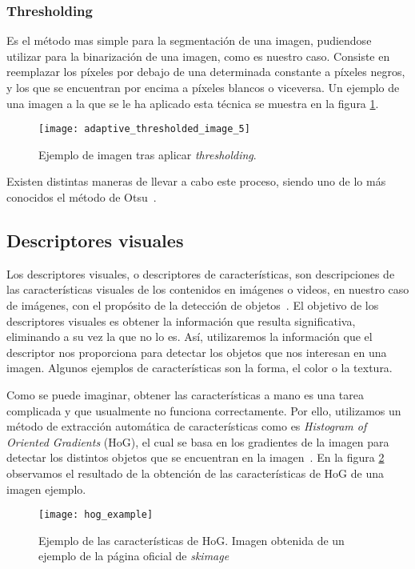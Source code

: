 \subsubsection{Thresholding}

Es el método mas simple para la segmentación de una imagen, pudiendose utilizar para la binarización de una imagen, como es nuestro caso. Consiste en reemplazar los píxeles por debajo de una determinada constante a píxeles negros, y los que se encuentran por encima a píxeles blancos o viceversa. Un ejemplo de una imagen a la que se le ha aplicado esta técnica se muestra en la figura \ref{fig:3.2.1}.

\begin{figure}
\centering
\texttt{[image: adaptive\_thresholded\_image\_5]}
\caption{Ejemplo de imagen tras aplicar \textit{thresholding}.}
\label{fig:3.2.1}
\end{figure}

Existen distintas maneras de llevar a cabo este proceso, siendo uno de lo más conocidos el método de Otsu~\cite{wiki:otsu}.

\subsection{Descriptores visuales}

Los descriptores visuales, o descriptores de características, son descripciones de las características visuales de los contenidos en imágenes o videos, en nuestro caso de imágenes, con el propósito de la detección de objetos~\cite{wiki:visualdescriptor}. El objetivo de los descriptores visuales es obtener la información que resulta significativa, eliminando a su vez la que no lo es. Así, utilizaremos la información que el descriptor nos proporciona para detectar los objetos que nos interesan en una imagen. Algunos ejemplos de características son la forma, el color o la textura.

Como se puede imaginar, obtener las características a mano es una tarea complicada y que usualmente no funciona correctamente. Por ello, utilizamos un método de extracción automática de características como es \textit{Histogram of Oriented Gradients} (HoG), el cual se basa en los gradientes de la imagen para detectar los distintos objetos que se encuentran en la imagen~\cite{wiki:hog}. En la figura \ref{fig:3.4.2} observamos el resultado de la obtención de las características de HoG de una imagen ejemplo.

\begin{figure}
\centering
\texttt{[image: hog\_example]}
\caption[Ejemplo de las características de HoG]{Ejemplo de las características de HoG. Imagen obtenida de un ejemplo de la página oficial de \textit{skimage}}
\label{fig:3.4.2}
\end{figure}

